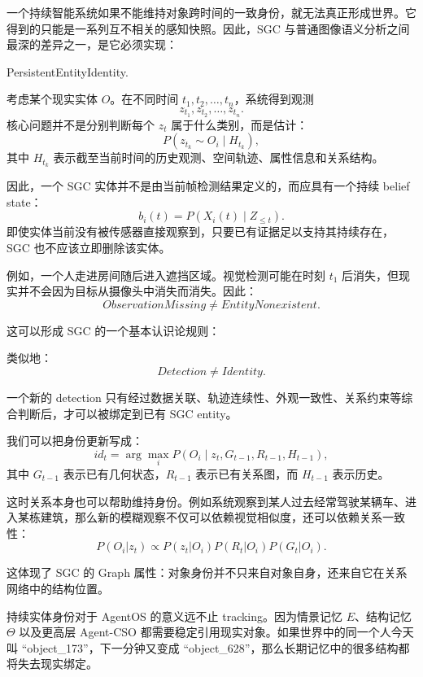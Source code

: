 一个持续智能系统如果不能维持对象跨时间的一致身份，就无法真正形成世界。它得到的只能是一系列互不相关的感知快照。因此，SGC 与普通图像语义分析之间最深的差异之一，是它必须实现：
\begin{statementbox}
PersistentEntityIdentity.
\end{statementbox}

考虑某个现实实体 \(O\)。在不同时间 \(t_1,t_2,\ldots,t_n\)，系统得到观测
\[
z_{t_1},z_{t_2},\ldots,z_{t_n}.
\]
核心问题并不是分别判断每个 \(z_t\) 属于什么类别，而是估计：
\[
P
\left(
z_{t_k}\sim O_i
\mid
H_{t_k}
\right),
\]
其中 \(H_{t_k}\) 表示截至当前时间的历史观测、空间轨迹、属性信息和关系结构。

因此，一个 SGC 实体并不是由当前帧检测结果定义的，而应具有一个持续 belief state：
\[
b_i(t)
=
P
\left(
X_i(t)
\mid
Z_{\leq t}
\right).
\]
即使实体当前没有被传感器直接观察到，只要已有证据足以支持其持续存在，SGC 也不应该立即删除该实体。

例如，一个人走进房间随后进入遮挡区域。视觉检测可能在时刻 \(t_1\) 后消失，但现实并不会因为目标从摄像头中消失而消失。因此：
\[
ObservationMissing
\neq
EntityNonexistent.
\]

这可以形成 SGC 的一个基本认识论规则：
\begin{statementbox}
\centering
{}
\end{statementbox}

类似地：
\[
Detection
\neq
Identity.
\]

一个新的 detection 只有经过数据关联、轨迹连续性、外观一致性、关系约束等综合判断后，才可以被绑定到已有 SGC entity。

我们可以把身份更新写成：
\[
id_t
=
\arg\max_i
P
\left(
O_i
\mid
z_t,
G_{t-1},
R_{t-1},
H_{t-1}
\right),
\]
其中 \(G_{t-1}\) 表示已有几何状态，\(R_{t-1}\) 表示已有关系图，而 \(H_{t-1}\) 表示历史。

这时关系本身也可以帮助维持身份。例如系统观察到某人过去经常驾驶某辆车、进入某栋建筑，那么新的模糊观察不仅可以依赖视觉相似度，还可以依赖关系一致性：
\[
P(O_i|z_t)
\propto
P(z_t|O_i)
P(R_t|O_i)
P(G_t|O_i).
\]

这体现了 SGC 的 Graph 属性：对象身份并不只来自对象自身，还来自它在关系网络中的结构位置。

持续实体身份对于 AgentOS 的意义远不止 tracking。因为情景记忆 \(E\)、结构记忆 \(\Theta\) 以及更高层 Agent-CSO 都需要稳定引用现实对象。如果世界中的同一个人今天叫 ``object\_173''，下一分钟又变成 ``object\_628''，那么长期记忆中的很多结构都将失去现实绑定。

